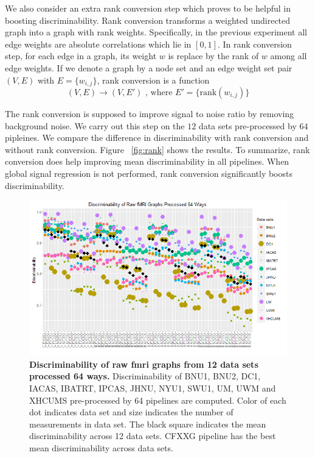 \documentclass{article}
\begin{document}
We also consider an extra  rank conversion step which proves to be helpful in boosting discriminability. Rank conversion transforms a weighted undirected graph into a graph with rank weights. Specifically, in the previous experiment all edge weights are absolute correlations which lie in $[0,1]$. In rank conversion step, for each edge in a graph, its weight $w$ is replace by the rank of $w$ among all edge weights. If we denote a graph by a node set and an edge weight set pair $(V,E)$ with $E=\{w_{i,j}\}$, rank conversion is a function
\[(V,E) \rightarrow (V,E') \text{ , where } E'= \{\text{rank}(w_{i,j})\} \]

The rank conversion is supposed to improve signal to noise ratio by removing background noise. We carry out this step on the $12$ data sets pre-processed by $64$ pipleines. We compare the difference in discriminability with rank conversion and without rank conversion. Figure ~\ref{fig:rank} shows the results. To summarize, rank conversion does help improving mean discriminability in all pipelines. When global signal regression is not performed, rank conversion significantly boosts discriminability. 

\begin{figure}[ht!]
	\includegraphics[width=\linewidth]{../Figs/64_pipelines_raw.png}
	\caption{{\bf Discriminability of raw fmri graphs from 12 data sets processed 64 ways.}  Discriminability of BNU1, BNU2, DC1, IACAS, IBATRT, IPCAS, JHNU, NYU1, SWU1, UM, UWM and XHCUMS pre-processed by 64 pipelines are computed. Color of each dot indicates data set and size indicates the number of measurements in data set. The black square indicates the mean discriminability across 12 data sets. CFXXG pipeline has the best mean discriminability across data sets.}
	\label{fig:pipes}
\end{figure}
\end{document}
